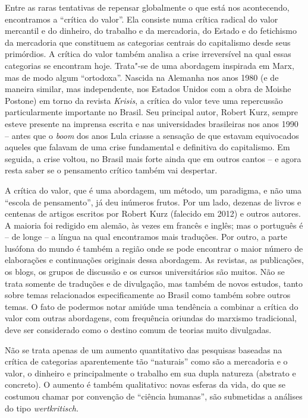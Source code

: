 Entre as raras tentativas de repensar globalmente o que está nos
acontecendo, encontramos a ``crítica do valor''. Ela consiste numa
crítica radical do valor mercantil e do dinheiro, do trabalho e da
mercadoria, do Estado e do fetichismo da mercadoria que constituem as
categorias centrais do capitalismo desde seus primórdios. A crítica do
valor também analisa a crise irreversível na qual essas categorias se
encontram hoje. Trata"-se de uma abordagem inspirada em Marx, mas de modo
algum ``ortodoxa''. Nascida na Alemanha nos anos 1980 (e de maneira
similar, mas independente, nos Estados Unidos com a obra de Moishe
Postone) em torno da revista \emph{Krisis}, a crítica do valor teve uma
repercussão particularmente importante no Brasil. Seu principal autor,
Robert Kurz, sempre esteve presente na imprensa escrita e nas universidades
brasileiras nos anos 1990 -- antes que o \emph{boom} dos anos Lula
criasse a sensação de que estavam equivocados aqueles que falavam de uma
crise fundamental e definitiva do capitalismo. Em seguida, a crise
voltou, no Brasil mais forte ainda que em outros cantos -- e agora resta
saber se o pensamento crítico também vai despertar.

A crítica do valor, que é uma abordagem, um método, um paradigma, e não
uma ``escola de pensamento'', já deu inúmeros frutos. Por um lado,
dezenas de livros e centenas de artigos escritos por Robert Kurz
(falecido em 2012) e outros autores. A maioria foi redigido em alemão,
às vezes em francês e inglês; mas o português é -- de longe -- a língua
na qual encontramos mais traduções. Por outro, a parte lusófona do mundo
é também a região onde se pode encontrar o maior número de elaborações
e continuações originais dessa abordagem. As revistas, as publicações,
os blogs, os grupos de discussão e os cursos universitários são muitos.
Não se trata somente de traduções e de divulgação, mas também de novos
estudos, tanto sobre temas relacionados especificamente ao Brasil como
também sobre outros temas. O fato de podermos notar amiúde uma tendência
a combinar a crítica do valor com outras abordagens, com frequência
oriundas do marxismo tradicional, deve ser considerado como o destino
comum de teorias muito divulgadas.

Não se trata apenas de um aumento quantitativo das pesquisas baseadas na
crítica de categorias aparentemente tão ``naturais'' como são a
mercadoria e o valor, o dinheiro e principalmente o trabalho em sua
dupla natureza (abstrato e concreto). O aumento é também qualitativo:
novas esferas da vida, do que se costumou chamar por convenção de
``ciência humanas'', são submetidas a análises do tipo
\emph{wertkritisch.}

